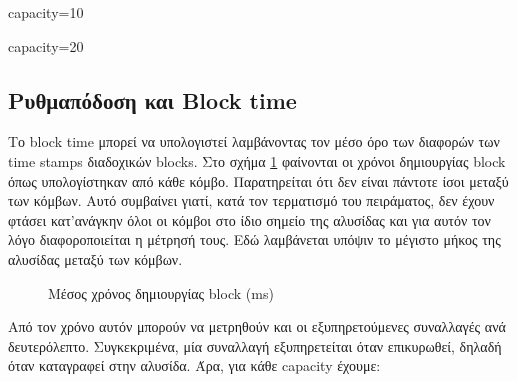 \documentclass{article}
\newcommand{\eng}[1]{\foreignlanguage{english}{#1}} %
\begin{document}
\begin{table}[ht]
    \ContinuedFloat
    \begin{subtable}{0.45\textwidth}
        \centering
        \caption{\eng{capacity=10}}
        \label{tab:throughput-funcs-2}
    \end{subtable}
    \hfill
    \begin{subtable}{0.45\textwidth}
        \centering
        \caption{\eng{capacity=20}}
        \label{tab:throughput-funcs-3}
    \end{subtable}
\end{table}
\FloatBarrier

\subsection{Ρυθμαπόδοση και \eng{Block time}}

Το \eng{block time} μπορεί να υπολογιστεί λαμβάνοντας τον μέσο όρο των
διαφορών των \eng{time stamps} διαδοχικών \eng{blocks}. Στο σχήμα
\ref{fig:throughput-blocktimes} φαίνονται οι χρόνοι δημιουργίας \eng{block} όπως
υπολογίστηκαν από κάθε κόμβο. Παρατηρείται ότι δεν είναι πάντοτε ίσοι μεταξύ
των κόμβων. Αυτό συμβαίνει γιατί, κατά τον τερματισμό του πειράματος, δεν έχουν
φτάσει κατ'ανάγκην όλοι οι κόμβοι στο ίδιο σημείο της αλυσίδας και για αυτόν τον
λόγο διαφοροποιείται η μέτρησή τους. Εδώ λαμβάνεται υπόψιν το μέγιστο μήκος της
αλυσίδας μεταξύ των κόμβων.

\begin{figure}[ht]
    \centering
    \begin{varwidth}{\linewidth}
        
    \end{varwidth}
    \caption{Μέσος χρόνος δημιουργίας \eng{block} (\eng{ms})}
    \label{fig:throughput-blocktimes}
\end{figure}

Από τον χρόνο αυτόν μπορούν να μετρηθούν και οι εξυπηρετούμενες συναλλαγές ανά δευτερόλεπτο.
Συγκεκριμένα, μία συναλλαγή εξυπηρετείται όταν επικυρωθεί, δηλαδή όταν καταγραφεί στην αλυσίδα.
Άρα, για κάθε \eng{capacity} έχουμε:
\end{document}
